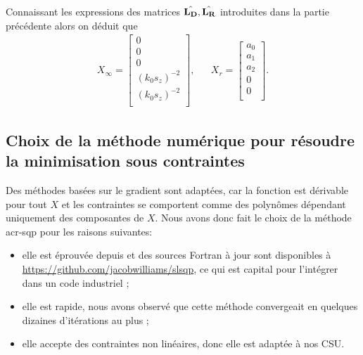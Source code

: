 Connaissant les expressions des matrices \(\hat{\mathbf{L_D}},\hat{\mathbf{L_R}}\) introduites dans la partie précédente alors on déduit que
\begin{align*}
  X_\infty = \begin{bmatrix}
    0\\
    0\\
    0\\
    (k_0 s_z)^{-2}\\
    (k_0 s_z)^{-2}\\
  \end{bmatrix},
  & &
  X_r = \begin{bmatrix}
  a_0\\
  a_1\\
  a_2\\
  0\\
  0\\
  \end{bmatrix}.
\end{align*}

\subsection{Choix de la méthode numérique pour résoudre la minimisation sous contraintes}

  Des méthodes basées sur le gradient sont adaptées, car la fonction est dérivable pour tout \(X\) et les contraintes se comportent comme des polynômes dépendant uniquement des composantes de \(X\). Nous avons donc fait le choix de la méthode \gls{acr-sqp} pour les raisons suivantes:
 
  \begin{itemize}
    \item elle est éprouvée depuis \cite{kraft_software_1988} et des sources Fortran à jour sont disponibles à \url{https://github.com/jacobwilliams/slsqp}, ce qui est capital pour l'intégrer dans un code industriel ;
    \item elle est rapide, nous avons observé que cette méthode convergeait en quelques dizaines d'itérations au plus ;
    \item elle accepte des contraintes non linéaires, donc elle est adaptée à nos CSU.
  \end{itemize}


